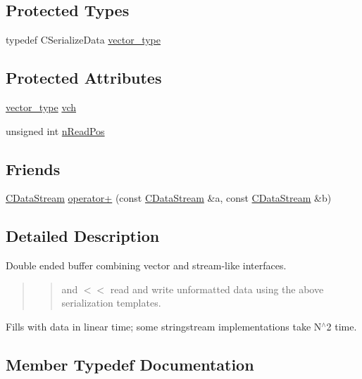 \subsection*{Protected Types}
\begin{DoxyCompactItemize}
\item 
typedef C\+Serialize\+Data \hyperlink{class_c_data_stream_a5e86187632a0d6cea39f3ea525427e27}{vector\+\_\+type}
\end{DoxyCompactItemize}
\subsection*{Protected Attributes}
\begin{DoxyCompactItemize}
\item 
\hyperlink{class_c_data_stream_a5e86187632a0d6cea39f3ea525427e27}{vector\+\_\+type} \hyperlink{class_c_data_stream_ac875adb8c720c48abd1a7c82f3452dda}{vch}
\item 
unsigned int \hyperlink{class_c_data_stream_af1c6a23b6725406d8f3464036a595556}{n\+Read\+Pos}
\end{DoxyCompactItemize}
\subsection*{Friends}
\begin{DoxyCompactItemize}
\item 
\hyperlink{class_c_data_stream}{C\+Data\+Stream} \hyperlink{class_c_data_stream_ae9d127e586618900bc753dfda97e9401}{operator+} (const \hyperlink{class_c_data_stream}{C\+Data\+Stream} \&a, const \hyperlink{class_c_data_stream}{C\+Data\+Stream} \&b)
\end{DoxyCompactItemize}


\subsection{Detailed Description}
Double ended buffer combining vector and stream-\/like interfaces.

\begin{quote}
\begin{quote}
and $<$$<$ read and write unformatted data using the above serialization templates. \end{quote}
\end{quote}
Fills with data in linear time; some stringstream implementations take N$^\wedge$2 time. 

\subsection{Member Typedef Documentation}
\hypertarget{class_c_data_stream_a297dff00e40bb161aab89fde868ee7b1}{}
